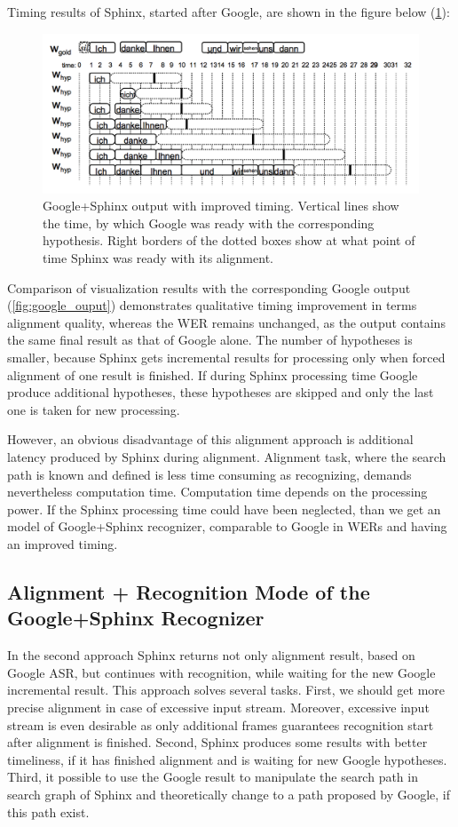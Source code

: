Timing results of Sphinx, started after Google, are shown in the figure below
(\ref{fig:conf_al_timing}):
\begin{figure}[htbp]
  \centering
    \includegraphics[width=1.0\textwidth]{images/gsphal.png}
 \caption{Google+Sphinx output with improved timing. Vertical lines show
 the time, by which Google was ready with the corresponding hypothesis.
 Right borders of the dotted boxes show at what point of time Sphinx was ready
 with its alignment.}
  \label{fig:conf_al_timing}
\end {figure}

Comparison of visualization results with the corresponding Google
output (\ref{fig:google_ouput}) demonstrates qualitative timing improvement in terms
alignment quality, whereas the WER remains unchanged, as the output contains
the same final result as that of Google alone. The number of hypotheses is
smaller, because Sphinx gets incremental results for processing only when
forced alignment of one result is finished.  If during Sphinx processing time
Google produce additional hypotheses, these hypotheses are skipped and only the
last one is taken for new processing. 

However, an obvious disadvantage of this alignment approach is additional
latency produced by Sphinx during alignment.
Alignment task, where the search path is known and defined is less time
consuming as recognizing, demands nevertheless computation time.  Computation
time depends on the processing power. If the Sphinx processing time could have
been neglected, than we get an model of Google+Sphinx recognizer,
comparable to Google in WERs and having an improved timing.

\subsection {Alignment + Recognition Mode  of the Google+Sphinx Recognizer}

In the second approach Sphinx returns not only alignment result, based on Google
ASR, but continues with recognition, while waiting for the new Google incremental result. 
This approach solves several tasks. First, we should get more precise alignment 
in case of excessive input stream. Moreover, excessive input stream is
even desirable as only additional frames guarantees recognition start after
alignment is finished. Second, Sphinx produces some results with better
timeliness, if it has finished alignment and is waiting for new Google
hypotheses. Third, it possible to use the Google result to manipulate the search
path in search graph of Sphinx and theoretically change to a path proposed by
Google, if this path exist. 

